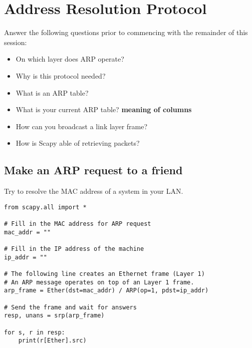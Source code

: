 \documentclass[11pt,a4paper]{article}
\begin{document}
\section{Address Resolution Protocol}
Answer the following questions prior to commencing with the remainder of this session:
\begin{itemize}
    \item On which layer does ARP operate?
    \item Why is this protocol needed?
    \item What is an ARP table?
    \item What is your current ARP table? \textbf{meaning of columns}
    \item How can you broadcast a link layer frame?
    \item How is Scapy able of retrieving packets?
\end{itemize}

\subsection{Make an ARP request to a friend}
Try to resolve the MAC address of a system in your LAN.

\begin{verbatim}
from scapy.all import *

# Fill in the MAC address for ARP request
mac_addr = "" 

# Fill in the IP address of the machine
ip_addr = ""

# The following line creates an Ethernet frame (Layer 1)
# An ARP message operates on top of an Layer 1 frame.
arp_frame = Ether(dst=mac_addr) / ARP(op=1, pdst=ip_addr)

# Send the frame and wait for answers
resp, unans = srp(arp_frame)

for s, r in resp:
    print(r[Ether].src)
\end{verbatim}
\end{document}
